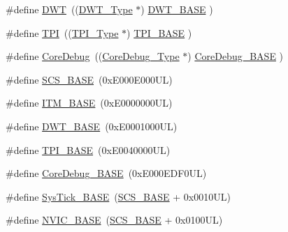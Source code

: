 \begin{DoxyCompactItemize}
\item 
\#define \mbox{\hyperlink{group___c_m_s_i_s__core__base_gabbe5a060185e1d5afa3f85b14e10a6ce}{D\+WT}}~((\mbox{\hyperlink{struct_d_w_t___type}{D\+W\+T\+\_\+\+Type}}       $\ast$)     \mbox{\hyperlink{group___c_m_s_i_s__core__base_gafdab534f961bf8935eb456cb7700dcd2}{D\+W\+T\+\_\+\+B\+A\+SE}}         )
\item 
\#define \mbox{\hyperlink{group___c_m_s_i_s__core__base_ga8b4dd00016aed25a0ea54e9a9acd1239}{T\+PI}}~((\mbox{\hyperlink{struct_t_p_i___type}{T\+P\+I\+\_\+\+Type}}       $\ast$)     \mbox{\hyperlink{group___c_m_s_i_s__core__base_ga2b1eeff850a7e418844ca847145a1a68}{T\+P\+I\+\_\+\+B\+A\+SE}}         )
\item 
\#define \mbox{\hyperlink{group___c_m_s_i_s__core__base_gab6e30a2b802d9021619dbb0be7f5d63d}{Core\+Debug}}~((\mbox{\hyperlink{struct_core_debug___type}{Core\+Debug\+\_\+\+Type}} $\ast$)     \mbox{\hyperlink{group___c_m_s_i_s__core__base_ga680604dbcda9e9b31a1639fcffe5230b}{Core\+Debug\+\_\+\+B\+A\+SE}}   )
\item 
\#define \mbox{\hyperlink{group___c_m_s_i_s__core__base_ga3c14ed93192c8d9143322bbf77ebf770}{S\+C\+S\+\_\+\+B\+A\+SE}}~(0x\+E000\+E000\+U\+L)
\item 
\#define \mbox{\hyperlink{group___c_m_s_i_s__core__base_gadd76251e412a195ec0a8f47227a8359e}{I\+T\+M\+\_\+\+B\+A\+SE}}~(0x\+E0000000\+U\+L)
\item 
\#define \mbox{\hyperlink{group___c_m_s_i_s__core__base_gafdab534f961bf8935eb456cb7700dcd2}{D\+W\+T\+\_\+\+B\+A\+SE}}~(0x\+E0001000\+U\+L)
\item 
\#define \mbox{\hyperlink{group___c_m_s_i_s__core__base_ga2b1eeff850a7e418844ca847145a1a68}{T\+P\+I\+\_\+\+B\+A\+SE}}~(0x\+E0040000\+U\+L)
\item 
\#define \mbox{\hyperlink{group___c_m_s_i_s__core__base_ga680604dbcda9e9b31a1639fcffe5230b}{Core\+Debug\+\_\+\+B\+A\+SE}}~(0x\+E000\+E\+D\+F0\+U\+L)
\item 
\#define \mbox{\hyperlink{group___c_m_s_i_s__core__base_ga58effaac0b93006b756d33209e814646}{Sys\+Tick\+\_\+\+B\+A\+SE}}~(\mbox{\hyperlink{group___c_m_s_i_s__core__base_ga3c14ed93192c8d9143322bbf77ebf770}{S\+C\+S\+\_\+\+B\+A\+SE}} +  0x0010\+U\+L)
\item 
\#define \mbox{\hyperlink{group___c_m_s_i_s__core__base_gaa0288691785a5f868238e0468b39523d}{N\+V\+I\+C\+\_\+\+B\+A\+SE}}~(\mbox{\hyperlink{group___c_m_s_i_s__core__base_ga3c14ed93192c8d9143322bbf77ebf770}{S\+C\+S\+\_\+\+B\+A\+SE}} +  0x0100\+U\+L)
\item 

\end{DoxyCompactItemize}
